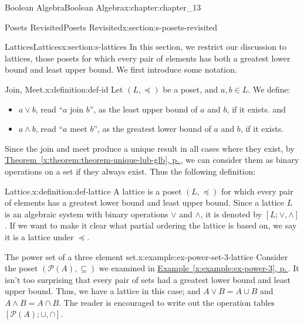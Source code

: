 \documentclass[twoside,10pt,]{book}
\newcommand{\xreffont}{\relax}
\numberwithin{equation}{section}
\begin{document}
\begin{chapterptx}{Boolean Algebra}{}{Boolean Algebra}{}{}{x:chapter:chapter_13}
\begin{sectionptx}{Posets Revisited}{}{Posets Revisited}{}{}{x:section:s-posets-revisited}
\end{sectionptx}
%
%
\typeout{************************************************}
\typeout{************************************************}
%
\begin{sectionptx}{Lattices}{}{Lattices}{}{}{x:section:s-lattices}
%
In this section, we restrict our discussion to lattices, those posets for which every pair of elements has both a greatest lower bound and least upper bound. We first introduce some notation.%
\begin{definition}{Join, Meet.}{x:definition:def-id}%
%
%
\label{g:notation:idm404593094672}%
\label{g:notation:idm404593093312}%
Let \((L, \preceq)\) be a poset, and \(a, b \in  L\). We define:%
\begin{itemize}[label=\textbullet]
\item{}\(a \lor  b\), read ``\(a\) join \(b\)'', as the least upper bound of \(a\) and \(b\), if it exists. and%
\item{}\(a \land  b\), read ``\(a\) meet \(b\)'', as the greatest lower bound of \(a\) and \(b\), if it exists.%
\end{itemize}
%
\end{definition}
Since the join and meet produce a unique result in all cases where they exist, by \hyperref[x:theorem:theorem-unique-lub-glb]{Theorem~{\xreffont\ref{x:theorem:theorem-unique-lub-glb}}, p.\,\pageref{x:theorem:theorem-unique-lub-glb}}, we can consider them as binary operations on a set if they always exist.   Thus the following definition:%
\begin{definition}{Lattice.}{x:definition:def-lattice}%
%
\label{g:notation:idm404593082832}%
A lattice is a poset \((L, \preceq)\) for which every pair of elements has a greatest lower bound and least upper bound. Since a lattice \(L\) is an algebraic system with binary operations \(\lor\) and \(\land\), it is denoted by \([L; \lor, \land]\). If we want to make it clear what partial ordering the lattice is based on, we say it is a lattice under \(\preceq\).%
\end{definition}
\begin{example}{The power set of a three element set.}{x:example:ex-power-set-3-lattice}%
Consider the poset \((\mathcal{P}(A),\subseteq)\) we examined in \hyperref[x:example:ex-power-3]{Example~{\xreffont\ref{x:example:ex-power-3}}, p.\,\pageref{x:example:ex-power-3}}.  It isn't too surprising that every pair of sets had a greatest lower bound and least upper bound. Thus, we have a lattice in this case; and  \(A\lor B = A \cup  B\) and \(A\land B = A \cap  B\). The reader is encouraged to write out the operation tables \([\mathcal{P}(A); \cup, \cap]\).%

\end{example}
\end{sectionptx}
\end{chapterptx}
\end{document}
